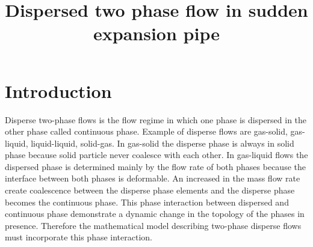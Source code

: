 \documentclass[
10pt, %
a4paper, %
oneside, %
headinclude,footinclude, %
BCOR5mm, %
]{scrartcl}
\title{Dispersed two phase flow in sudden expansion pipe} %
\author{\spacedlowsmallcaps{Yapi Donatien Achou}} %
\date{} %
\begin{document}

\renewcommand{\sectionmark}[1]{\markright{\spacedlowsmallcaps{#1}}} %
\lehead{\mbox{\llap{\small\thepage\kern1em\color{halfgray} \vline}\color{halfgray}\hspace{0.5em}\rightmark\hfil}} %

\pagestyle{scrheadings} %


\maketitle %

\setcounter{tocdepth}{2} %

\tableofcontents %

\listoffigures %

\listoftables %



\section{Introduction}
Disperse two-phase flows is the flow regime in which one phase is dispersed in the other phase called continuous phase. Example of disperse flows are gas-solid, gas-liquid, liquid-liquid, solid-gas. In gas-solid the disperse phase is always in solid phase because solid particle never coalesce with each other. In gas-liquid flows the dispersed phase is determined mainly by the flow rate of both phases because the interface between both phases is deformable. An increased in the mass flow rate create coalescence between the disperse phase elements and the disperse phase becomes the continuous phase. This phase interaction between dispersed and continuous phase demonstrate a dynamic change in the topology of the phases in presence. Therefore the mathematical model describing two-phase disperse flows must incorporate this phase interaction.
\end{document}
